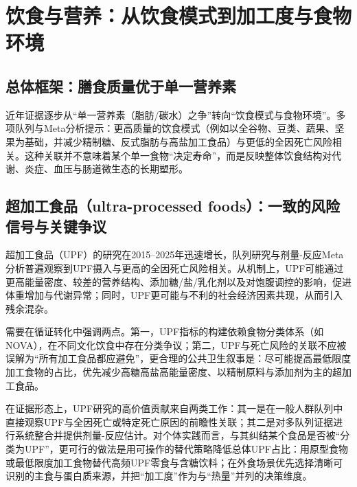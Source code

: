 \documentclass[11pt,a4paper]{article}
\begin{document}
\section{饮食与营养：从饮食模式到加工度与食物环境}

\subsection{总体框架：膳食质量优于单一营养素}

近年证据逐步从“单一营养素（脂肪/碳水）之争”转向“饮食模式与食物环境”。多项队列与Meta分析提示：更高质量的饮食模式（例如以全谷物、豆类、蔬果、坚果为基础，并减少精制糖、反式脂肪与高盐加工食品）与更低的全因死亡风险相关\cite{aperspectiveon2015,plantbaseddietary2016,plantbasedand2024,associationofplant2024}。这种关联并不意味着某个单一食物“决定寿命”，而是反映整体饮食结构对代谢、炎症、血压与肠道微生态的长期塑形。

\subsection{超加工食品（ultra-processed foods）：一致的风险信号与关键争议}

超加工食品（UPF）的研究在2015--2025年迅速增长，队列研究与剂量-反应Meta分析普遍观察到UPF摄入与更高的全因死亡风险相关\cite{ultraprocessedfood2021,ultraprocessedfood2022,doseresponsemeta2023,associationbetweenultra2024}。从机制上，UPF可能通过更高能量密度、较差的营养结构、添加糖/盐/乳化剂以及对饱腹调控的影响，促进体重增加与代谢异常；同时，UPF更可能与不利的社会经济因素共现，从而引入残余混杂。\cite{theundecade2017,doestheconcept2022}

需要在循证转化中强调两点。第一，UPF指标的构建依赖食物分类体系（如NOVA），在不同文化饮食中存在分类争议；第二，UPF与死亡风险的关联不应被误解为“所有加工食品都应避免”，更合理的公共卫生叙事是：尽可能提高最低限度加工食物的占比，优先减少高糖高盐高能量密度、以精制原料与添加剂为主的超加工食品。\cite{ultraprocessedfood2022,doseresponsemeta2023}

在证据形态上，UPF研究的高价值贡献来自两类工作：其一是在一般人群队列中直接观察UPF与全因死亡或特定死亡原因的前瞻性关联\cite{ultraprocessedfood2024,ultraprocessedfood2018,consumptionofultra2023}；其二是对多队列证据进行系统整合并提供剂量-反应估计\cite{ultraprocessedfoods2025,associationbetweenultra2022}。对个体实践而言，与其纠结某个食品是否被“分类为UPF”，更可行的做法是用可操作的替代策略降低总体UPF占比：用原型食物或最低限度加工食物替代高频UPF零食与含糖饮料；在外食场景优先选择清晰可识别的主食与蛋白质来源，并把“加工度”作为与“热量”并列的决策维度。\cite{addedflavorspotential2022}
\end{document}
